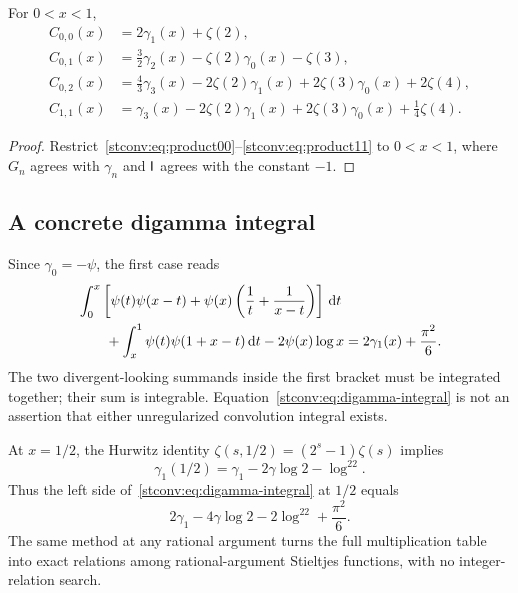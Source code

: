 \begin{corollary}\label{stconv:cor:scalar}
For $0<x<1$,
\begin{align}
 C_{0,0}(x)&=2\gamma_1(x)+\zeta(2),\label{stconv:eq:C00}\\
 C_{0,1}(x)&=\frac32\gamma_2(x)-\zeta(2)\gamma_0(x)-\zeta(3),\label{stconv:eq:C01}\\
 C_{0,2}(x)&=\frac43\gamma_3(x)-2\zeta(2)\gamma_1(x)
                    +2\zeta(3)\gamma_0(x)+2\zeta(4),\label{stconv:eq:C02}\\
 C_{1,1}(x)&=\gamma_3(x)-2\zeta(2)\gamma_1(x)
                    +2\zeta(3)\gamma_0(x)+\frac14\zeta(4).
 \label{stconv:eq:C11}
\end{align}
\end{corollary}
\begin{proof}
Restrict~\eqref{stconv:eq:product00}--\eqref{stconv:eq:product11} to $0<x<1$, where
$G_n$ agrees with $\gamma_n$ and $\mathsf I$ agrees with the constant $-1$.
\end{proof}

\subsection{A concrete digamma integral}
Since $\gamma_0=-\psi$, the first case reads
\begin{align}
 &\int_0^x\left[\psi(t)\psi(x-t)+\psi(x)\left(\frac1t+\frac1{x-t}\right)\right]\,\mathrm d t
 \label{stconv:eq:digamma-integral}\\
 &\qquad+\int_x^1\psi(t)\psi(1+x-t)\,\mathrm d t-2\psi(x)\log x
 =2\gamma_1(x)+\frac{\pi^2}{6}.\notag
\end{align}
The two divergent-looking summands inside the first bracket must be
integrated together; their sum is integrable. Equation~\eqref{stconv:eq:digamma-integral}
is not an assertion that either unregularized convolution integral exists.

At $x=1/2$, the Hurwitz identity
$\zeta(s,1/2)=(2^s-1)\zeta(s)$ implies
\[
 \gamma_1(1/2)=\gamma_1-2\gamma\log2-\log^22.
\]
Thus the left side of~\eqref{stconv:eq:digamma-integral} at $1/2$ equals
\begin{equation}\label{stconv:eq:half}
 2\gamma_1-4\gamma\log2-2\log^22+\frac{\pi^2}{6}.
\end{equation}
The same method at any rational argument turns the full multiplication
table into exact relations among rational-argument Stieltjes functions,
with no integer-relation search.
